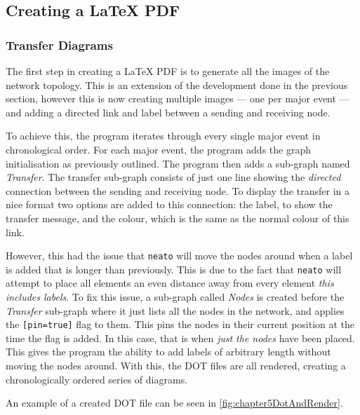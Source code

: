 \subsection{Creating a LaTeX PDF}
\subsubsection{Transfer Diagrams}
The first step in creating a LaTeX PDF is to generate all the images of the network topology.
This is an extension of the development done in the previous section, however this is now creating multiple images — one per major event — and adding a directed link and label between a sending and receiving node.

To achieve this, the program iterates through every single major event in chronological order.
For each major event, the program adds the graph initialisation as previously outlined.
The program then adds a sub-graph named \emph{Transfer}.
The transfer sub-graph consists of just one line showing the \emph{directed} connection between the sending and receiving node.
To display the transfer in a nice format two options are added to this connection: the label, to show the transfer message, and the colour, which is the same as the normal colour of this link.


However, this had the issue that \verb|neato| will move the nodes around when a label is added that is longer than previously.
This is due to the fact that \verb|neato| will attempt to place all elements an even distance away from every element \emph{this includes labels}. 
To fix this issue, a sub-graph called \emph{Nodes} is created before the \emph{Transfer} sub-graph where it just lists all the nodes in the network, and applies the \verb|[pin=true]| flag to them.
This pins the nodes in their current position at the time the flag is added.
In this case, that is when \emph{just the nodes} have been placed.
This gives the program the ability to add labels of arbitrary length without moving the nodes around.
With this, the DOT files are all rendered, creating a chronologically ordered series of diagrams.

An example of a created DOT file can be seen in \figurename{ \ref{fig:chapter5DotAndRender}}.


